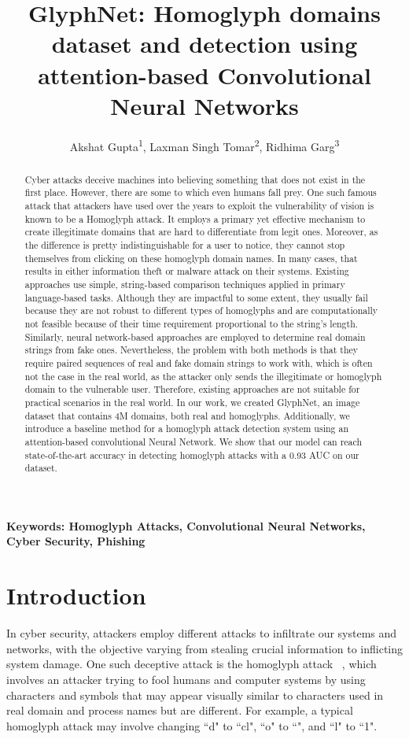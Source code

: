 \documentclass[letterpaper]{article} \usepackage{aaai22}  \usepackage{times}  \usepackage{helvet}  \usepackage{courier}  \usepackage[hyphens]{url}  \usepackage{graphicx} \urlstyle{rm} \def\UrlFont{\rm}  \usepackage{natbib}  \usepackage{caption} \DeclareCaptionStyle{ruled}{labelfont=normalfont,labelsep=colon,strut=off} \frenchspacing  \setlength{\pdfpagewidth}{8.5in}  \setlength{\pdfpageheight}{11in}  \usepackage{algorithm}
\title{GlyphNet: Homoglyph domains dataset and detection using attention-based Convolutional Neural Networks}
\author{
Akshat Gupta\textsuperscript{\rm 1},
    Laxman Singh Tomar\equalcontrib \textsuperscript{\rm 2},
    Ridhima Garg\equalcontrib \textsuperscript{\rm 3}
}
\begin{document}
\maketitle

\begin{abstract}
Cyber attacks deceive machines into believing something that does not exist in the first place. However, there are some to which even humans fall prey. One such famous attack that attackers have used over the years to exploit the vulnerability of vision is known to be a Homoglyph attack. It employs a primary yet effective mechanism to create illegitimate domains that are hard to differentiate from legit ones. Moreover, as the difference is pretty indistinguishable for a user to notice, they cannot stop themselves from clicking on these homoglyph domain names.
In many cases, that results in either information theft or malware attack on their systems. Existing approaches use simple, string-based comparison techniques applied in primary language-based tasks. Although they are impactful to some extent, they usually fail because they are not robust to different types of homoglyphs and are computationally not feasible because of their time requirement proportional to the string's length.
Similarly, neural network-based approaches are employed to determine real domain strings from fake ones. Nevertheless, the problem with both methods is that they require paired sequences of real and fake domain strings to work with, which is often not the case in the real world, as the attacker only sends the illegitimate or homoglyph domain to the vulnerable user. Therefore, existing approaches are not suitable for practical scenarios in the real world. In our work, we created GlyphNet, an image dataset that contains 4M domains, both real and homoglyphs. Additionally, we introduce a baseline method for a homoglyph attack detection system using an attention-based convolutional Neural Network. We show that our model can reach state-of-the-art accuracy in detecting homoglyph attacks with a 0.93 AUC on our dataset. 
\end{abstract}

\textbf{Keywords: Homoglyph Attacks, Convolutional Neural Networks, Cyber Security, Phishing}

\section{Introduction}
In cyber security, attackers employ different attacks to infiltrate our systems and networks, with the objective varying from stealing crucial information to inflicting system damage. One such deceptive attack is the homoglyph attack ~\cite{woodbridge2018detecting}, which involves an attacker trying to fool humans and computer systems by using characters and symbols that may appear visually similar to characters used in real domain and process names but are different. For example, a typical homoglyph attack may involve changing ``d" to ``cl", ``o" to ``", and ``l" to ``1". 
\end{document}
